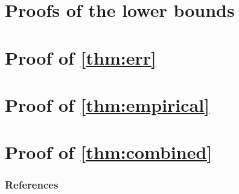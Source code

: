 \documentclass{article}
\begin{document}
\begin{bibunit}[myunsrt]
  \section{Proofs of the lower bounds}\label{app:lower}
  

  \section{Proof of \cref{thm:err}}\label{app:upper}
  

  \section{Proof of \cref{thm:empirical}}\label{app:empirical}
  

  \section{Proof of \cref{thm:combined}}\label{app:combined}
  

  \subsubsection*{References}
  {\def\section*#1{}\small\putbib[all]}
\end{bibunit}
\end{document}
